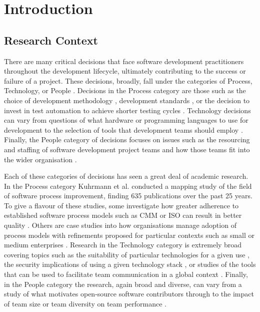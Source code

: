 
\graphicspath{{Chapter1/Figures/}{Chapter1/Tables/}{Chapter1/Charts/}}

\chapter{Introduction}

\section{Research Context} %
There are many critical decisions that face software development practitioners throughout the development lifecycle, ultimately contributing to the success or failure of a project. These decisions, broadly, fall under the categories of Process, Technology, or People \citep{nasir2011critical}. Decisions in the Process category are those such as the choice of development methodology \citep{chow2008survey, vijayasarathy2016choice}, development standards \citep{rainer2002key}, or the decision to invest in test automation to achieve shorter testing cycles \citep{lewis2016software}. Technology decisions can vary from questions of what hardware or programming languages to use for development to the selection of tools that development teams should employ \citep{scheer2000enterprise, ray2017survey, chen2018gflink, eichhorn2018comparative}. Finally, the People category of decisions focuses on issues such as the resourcing and staffing of software development project teams and how those teams fit into the wider organisation \citep{krishnan1998role, andrejczuk2017synergistic, alfayez2018exploratory}.

Each of these categories of decisions has seen a great deal of academic research. In the Process category Kuhrmann et al. \citep{kuhrmann2015software} conducted a mapping study of the field of software process improvement, finding 635 publications over the past 25 years. To give a flavour of these studies, some investigate how greater adherence to established software process models such as CMM \citep{paulk1993capability} or ISO \citep{ISO15504} can result in better quality \citep{harter2012does, abrahamsson2013measuring}. Others are case studies into how organisations manage adoption of process models with refinements proposed for particular contexts such as small or medium enterprises \citep{balla2001quality, sulayman2012software}. Research in the Technology category is extremely broad covering topics such as the suitability of particular technologies for a given use \citep{sharp2003evaluating, baker2006real}, the security implications of using a given technology stack \citep{mirheidari2012two, choukse2012developing, gangwar2014web}, or studies of the tools that can be used to facilitate team communication in a global context \citep{portillo2012tools}. Finally, in the People category the research, again broad and diverse, can vary from a study of what motivates open-source software contributors through to the impact of team size or team diversity on team performance \citep{hoch2010most, von2012carrots}. 

